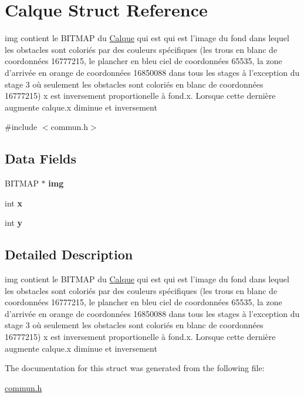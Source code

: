 \hypertarget{struct_calque}{\section{Calque Struct Reference}
\label{struct_calque}
}


img contient le B\-I\-T\-M\-A\-P du \hyperlink{struct_calque}{Calque} qui est qui est l'image du fond dans lequel les obstacles sont coloriés par des couleurs spécifiques (les trous en blanc de coordonnées 16777215, le plancher en bleu ciel de coordonnées 65535, la zone d'arrivée en orange de coordonnées 16850088 dans tous les stages à l'exception du stage 3 où seulement les obstacles sont coloriés en blanc de coordonnées 16777215) x est inversement proportionelle à fond.\-x. Lorsque cette dernière augmente calque.\-x diminue et inversement  




{\ttfamily \#include $<$commun.\-h$>$}

\subsection*{Data Fields}
\begin{DoxyCompactItemize}
\item 
\hypertarget{struct_calque_a8eae42c4d58d3ee6b9aa56d0071971fa}{B\-I\-T\-M\-A\-P $\ast$ {\bfseries img}}\label{struct_calque_a8eae42c4d58d3ee6b9aa56d0071971fa}

\item 
\hypertarget{struct_calque_a6150e0515f7202e2fb518f7206ed97dc}{int {\bfseries x}}\label{struct_calque_a6150e0515f7202e2fb518f7206ed97dc}

\item 
\hypertarget{struct_calque_a0a2f84ed7838f07779ae24c5a9086d33}{int {\bfseries y}}\label{struct_calque_a0a2f84ed7838f07779ae24c5a9086d33}

\end{DoxyCompactItemize}


\subsection{Detailed Description}
img contient le B\-I\-T\-M\-A\-P du \hyperlink{struct_calque}{Calque} qui est qui est l'image du fond dans lequel les obstacles sont coloriés par des couleurs spécifiques (les trous en blanc de coordonnées 16777215, le plancher en bleu ciel de coordonnées 65535, la zone d'arrivée en orange de coordonnées 16850088 dans tous les stages à l'exception du stage 3 où seulement les obstacles sont coloriés en blanc de coordonnées 16777215) x est inversement proportionelle à fond.\-x. Lorsque cette dernière augmente calque.\-x diminue et inversement 


\begin{DoxyItemize}
\item 
\end{DoxyItemize}

The documentation for this struct was generated from the following file\-:\begin{DoxyCompactItemize}
\item 
\hyperlink{commun_8h}{commun.\-h}\end{DoxyCompactItemize}
